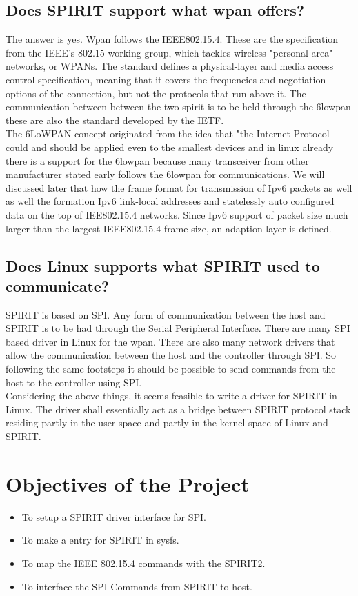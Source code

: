 \subsection{Does SPIRIT support what wpan offers?}
The answer is yes. Wpan follows the IEEE802.15.4. These are the specification from the IEEE's 802.15 working group, which tackles wireless "personal area" networks, or WPANs. The standard defines a physical-layer and media access control specification, meaning that it covers the frequencies and negotiation options of the connection, but not the protocols that run above it. The communication between between the two spirit is to be held through the 6lowpan these are also the standard developed by the IETF.\\
The 6LoWPAN concept originated from the idea that "the Internet Protocol could and should be applied even to the smallest devices and in linux already there is a support for the 6lowpan because many transceiver from other manufacturer stated early follows the 6lowpan for communications. We will discussed later that how the frame format for transmission of Ipv6 packets as well as well the formation Ipv6 link-local addresses and statelessly auto configured data on the top of IEE802.15.4 networks. Since Ipv6 support of packet size much larger than the largest IEEE802.15.4 frame size, an adaption layer is defined. 
\subsection{Does Linux supports what SPIRIT used to communicate?}
SPIRIT is based on SPI. Any form of communication between the host and SPIRIT is to be had through the Serial Peripheral Interface. There are many SPI based driver in Linux for the wpan.   There are also many network drivers that allow the communication between the host and the controller through SPI. So following the same footsteps it should be possible to send commands from the host to the controller using SPI.\\
Considering the above things, it seems feasible to write a driver for SPIRIT in Linux. The driver shall essentially act as a bridge between SPIRIT protocol stack residing partly in the user space and partly in the kernel space of Linux and SPIRIT.
\section{Objectives of the Project}
\begin{itemize}
	\item To setup a SPIRIT driver interface for SPI.
	\item To make a entry for SPIRIT in sysfs.
	\item To map the IEEE 802.15.4 commands with the SPIRIT2.
	\item To interface the SPI Commands from SPIRIT to host.
\end{itemize}
